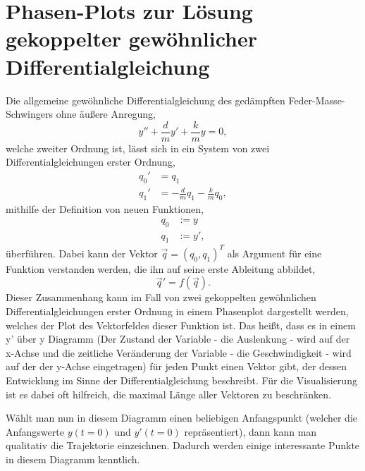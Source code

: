 \documentclass{article}
\begin{document}
    \section{Phasen-Plots zur Lösung gekoppelter gewöhnlicher Differentialgleichung}

    Die allgemeine gewöhnliche Differentialgleichung des gedämpften Feder-Masse-Schwingers ohne äußere Anregung,
    \begin{equation}
        y'' + \frac{d}{m} y' + \frac{k}{m} y = 0,
    \end{equation}
    welche zweiter Ordnung ist, lässt sich in ein System von zwei Differentialgleichungen erster Ordnung,
    \begin{align}
        q_0' &= q_1\\
        q_1' &= -\frac{d}{m} q_1 - \frac{k}{m} q_0,
    \end{align}
    mithilfe der Definition von neuen Funktionen,
    \begin{align}
        q_0 &:= y\\
        q_1 &:= y',
    \end{align}
    überführen. Dabei kann der Vektor $\vec{q} = (q_0, q_1)^T$ als Argument für eine Funktion verstanden werden, die ihn auf seine erste Ableitung abbildet,
    \begin{equation}
        \vec{q}' = f(\vec{q}).
    \end{equation}
    Dieser Zusammenhang kann im Fall von zwei gekoppelten gewöhnlichen Differentialgleichungen erster Ordnung in einem Phasenplot dargestellt werden, welches der Plot des Vektorfeldes dieser Funktion ist. Das heißt, dass es in einem y' über y Diagramm (Der Zustand der Variable - die Auslenkung - wird auf der \glqq{}x-Achse\grqq{} und die zeitliche Veränderung der Variable - die Geschwindigkeit - wird auf der der \glqq{}y-Achse\grqq{} eingetragen) für jeden Punkt einen Vektor gibt, der dessen Entwicklung im Sinne der Differentialgleichung beschreibt. Für die Visualisierung ist es dabei oft hilfreich, die maximal Länge aller Vektoren zu beschränken.

    Wählt man nun in diesem Diagramm einen beliebigen Anfangspunkt (welcher die Anfangswerte $y(t=0)$ und $y'(t=0)$ repräsentiert), dann kann man qualitativ die Trajektorie einzeichnen. Dadurch werden einige interessante Punkte in diesem Diagramm kenntlich.
\end{document}
